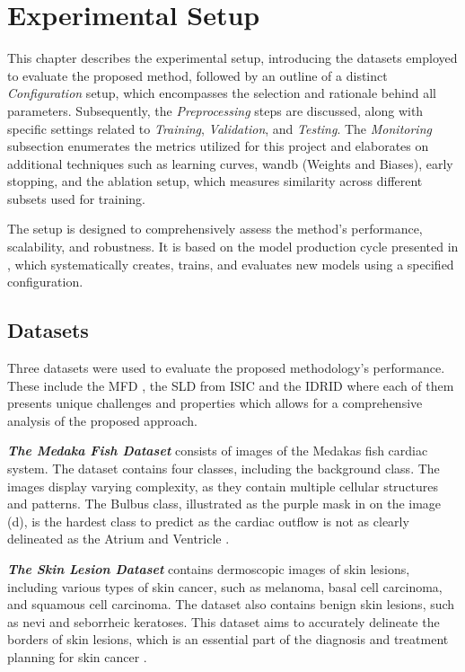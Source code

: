 \chapter{Experimental Setup}
\label{chap:experimental_setup}
This chapter describes the experimental setup, introducing the datasets employed to evaluate the proposed method, followed by an outline of a distinct \emph{Configuration} setup, which encompasses the selection and rationale behind all parameters. Subsequently, the \emph{Preprocessing} steps are discussed, along with specific settings related to \emph{Training}, \emph{Validation}, and \emph{Testing}. The \emph{Monitoring} subsection enumerates the metrics utilized for this project and elaborates on additional techniques such as learning curves, \ac{wandb} (Weights and Biases), early stopping, and the ablation setup, which measures similarity across different subsets used for training.

The setup is designed to comprehensively assess the method's performance, scalability, and robustness. It is based on the model production cycle presented in , which systematically creates, trains, and evaluates new models using a specified configuration.

\section{Datasets}
\label{sec:datasets}
Three datasets were used to evaluate the proposed methodology's performance. These include the \acf{MFD} \cite{10.1371/journal.pone.0263656}, the \acf{SLD} from \ac{ISIC} \cite{DBLP:journals/corr/abs-1710-05006} and the \acf{IDRID} \cite{h25w9818} where each of them presents unique challenges and properties which allows for a comprehensive analysis of the proposed approach.

\textbf{\emph{The Medaka Fish Dataset}} consists of images of the Medakas fish cardiac system. The dataset contains four classes, including the background class. The images display varying complexity, as they contain multiple cellular structures and patterns. The Bulbus class, illustrated as the purple mask in  on the image (d), is the hardest class to predict as the cardiac outflow is not as clearly delineated as the Atrium and Ventricle \cite{10.1371/journal.pone.0263656}.

\textbf{\emph{The Skin Lesion Dataset}} contains dermoscopic images of skin lesions, including various types of skin cancer, such as melanoma, basal cell carcinoma, and squamous cell carcinoma. The dataset also contains benign skin lesions, such as nevi and seborrheic keratoses. This dataset aims to accurately delineate the borders of skin lesions, which is an essential part of the diagnosis and treatment planning for skin cancer \cite{DBLP:journals/corr/abs-1710-05006}.

